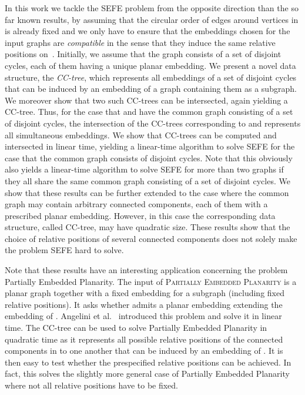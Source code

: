 \documentclass{scrartcl}
\renewcommand{\todo}[1]{}
\newcommand{\1}[1]{{\normalfont \ensuremath{#1^{\tiny\circled{1}}}}} \newcommand{\2}[1]{{\normalfont \ensuremath{#1^{\tiny\circled{2}}}}} \renewcommand{\k}[1]{{\normalfont \ensuremath{#1^{\tiny\circled{k}}}}} \newcommand{\proj}[2]{\ensuremath{\left.#1\right|_{#2}}} \newcommand{\eps}{\varepsilon}
\theoremstyle{plain} \newtheorem{theorem}{Theorem} \newcounter{lemmacounter} \setcounter{lemmacounter}{0} \newtheorem{lemma}[lemmacounter]{Lemma} \newtheorem{fact}{Fact}  \newtheorem{corollary}{Corollary} \theoremstyle{definition} \newtheorem{definition}{Definition}
\begin{document}
In this work we tackle the {\sc SEFE} problem from the opposite
direction \todo{Pag 3, line -6}than the so far known results, by
assuming that the circular order of edges around vertices in  is
already fixed and we only have to ensure that the embeddings chosen
for the input graphs are \emph{compatible} in the sense that they
induce the same relative positions on~.  Initially, we assume that
the graph  consists of a set of disjoint cycles, each of them
having a unique planar embedding.  We present a novel data structure,
the \emph{CC-tree}, which represents all embeddings of a set of
disjoint cycles that can be induced by an embedding of a graph
containing them as a subgraph.  We moreover show that two such
CC-trees can be intersected, again yielding a CC-tree.  Thus, for the
case that  and  have the common graph  consisting of a
set of disjoint cycles, the intersection of the CC-trees corresponding
to  and  represents all simultaneous embeddings.  We show
that CC-trees can be computed and intersected in linear time, yielding
a linear-time algorithm to solve {\sc SEFE} for the case that the
common graph consists of disjoint cycles.  Note that this obviously
also yields a linear-time algorithm to solve {\sc SEFE} for more than
two graphs if they all share the same common graph consisting of a set
of disjoint cycles.  We show that these results can be further
extended to the case where the common graph may contain arbitrary
connected components, each of them with a prescribed planar embedding.
However, in this case the corresponding data structure, called
CC-tree, may have quadratic size.  These results show that
the choice of relative positions of several connected components does
not solely make the problem {\sc SEFE} hard to solve.

\todo{Pag 3, line 14-15:}Note that these results have an interesting
application concerning the problem {\sc Partially Embedded Planarity}.
The input of \textsc{Partially Embedded Planarity} is a planar graph
 together with a fixed embedding for a subgraph  (including
fixed relative positions).  It asks whether  admits a planar
embedding extending the embedding of .  Angelini et
al.~\cite{adf-tppeg-10} introduced this problem and solve it in linear
time.  The CC-tree can be used to solve {\sc Partially
  Embedded Planarity} in quadratic time as it represents all possible
relative positions of the connected components in  to one another
that can be induced by an embedding of .  It is \todo{Pag 3, line
  18:}then easy to test whether the prespecified relative positions
can be achieved.  In fact, this solves the slightly more general case
of {\sc Partially Embedded Planarity} where not all relative positions
have to be fixed.
\end{document}
